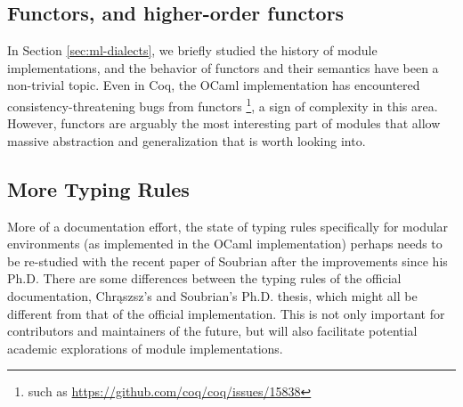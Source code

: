 

\subsection{Functors, and higher-order functors}

In Section \ref{sec:ml-dialects}, we briefly studied the history of module
implementations, and the behavior of functors and their semantics have been a
non-trivial topic. Even in Coq, the OCaml implementation has encountered
consistency-threatening bugs from functors
\footnote{such as \url{https://github.com/coq/coq/issues/15838}}, a sign of complexity in this
area. However, functors are arguably the most interesting part of modules that
allow massive abstraction and generalization that is worth looking into.


\subsection{More Typing Rules}

More of a documentation effort, the state of typing rules specifically for
modular environments (as implemented in the OCaml implementation) perhaps needs
to be re-studied with the recent paper of Soubrian after the improvements since
his Ph.D. There are some differences between the typing rules of the official
documentation, Chr{\k{a}}szsz's and Soubrian's Ph.D. thesis, which might all be
different from that of the official implementation. This is not only important
for contributors and maintainers of the future, but will also facilitate
potential academic explorations of module implementations.
